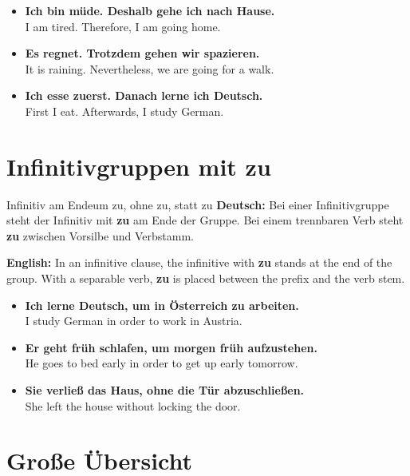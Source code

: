 \documentclass[a4paper,11pt]{article}
\newcommand{\GermanText}[1]{\textbf{Deutsch: }#1\par}
\newcommand{\EnglishText}[1]{{\small\color{SoftGray}\textbf{English: }#1\par}}
\newcommand{\ExampleItem}[2]{\item \textbf{#1}\\{\small\color{SoftGray}#2}}
\begin{document}
            \begin{exbox}
                \begin{itemize}
                    \ExampleItem{Ich bin müde. Deshalb gehe ich nach Hause.}{I am tired. Therefore, I am going home.}
                    \ExampleItem{Es regnet. Trotzdem gehen wir spazieren.}{It is raining. Nevertheless, we are going for a walk.}
                    \ExampleItem{Ich esse zuerst. Danach lerne ich Deutsch.}{First I eat. Afterwards, I study German.}
                \end{itemize}
            \end{exbox}
    
    
    \section{Infinitivgruppen mit \glqq zu\grqq}
        
        \begin{grammarentry}{Infinitiv am Ende}{um zu, ohne zu, statt zu}
            \GermanText{Bei einer Infinitivgruppe steht der Infinitiv mit \textbf{zu} am Ende der Gruppe. Bei einem trennbaren Verb steht \textbf{zu} zwischen Vorsilbe und Verbstamm.}
            \EnglishText{In an infinitive clause, the infinitive with \textbf{zu} stands at the end of the group. With a separable verb, \textbf{zu} is placed between the prefix and the verb stem.}
        \end{grammarentry}
        
        \begin{exbox}
            \begin{itemize}
                \ExampleItem{Ich lerne Deutsch, um in Österreich zu arbeiten.}{I study German in order to work in Austria.}
                \ExampleItem{Er geht früh schlafen, um morgen früh aufzustehen.}{He goes to bed early in order to get up early tomorrow.}
                \ExampleItem{Sie verließ das Haus, ohne die Tür abzuschließen.}{She left the house without locking the door.}
            \end{itemize}
        \end{exbox}
    
    
    \section{Große Übersicht}
        
\end{document}
